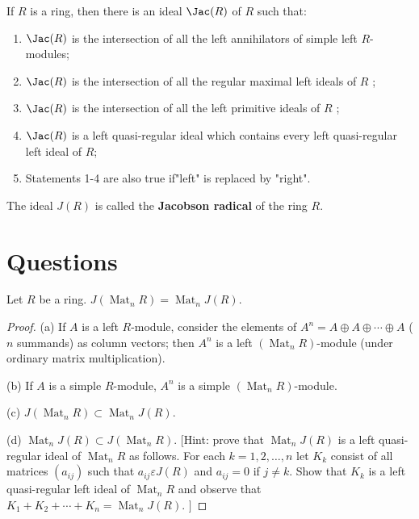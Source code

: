 \begin{theorem}
    If $R$ is a ring, then there is an ideal $\Jac(R)$ of $R$ such that:
    \begin{enumerate}
        \item
              $\Jac(R)$ is the intersection of all the left annihilators of simple left $R$-modules;

        \item
              $\Jac(R)$ is the intersection of all the regular maximal left ideals of $R$ ;

        \item
              $\Jac(R)$ is the intersection of all the left primitive ideals of $R$ ;

        \item
              $\Jac(R)$ is a left quasi-regular ideal which contains every left quasi-regular left ideal of $R$;

        \item
              Statements 1-4 are also true if"left" is replaced by "right".
    \end{enumerate}
    The ideal $J(R)$ is called the \textbf{Jacobson radical} of the ring $R$.
\end{theorem}



\section{Questions}
\begin{question}
    Let $R$ be a ring. $J\left(\operatorname{Mat}_n R\right)=\operatorname{Mat}_n J(R)$.
    \begin{proof}
        (a) If $A$ is a left $R$-module, consider the elements of $A^n=A \oplus A \oplus \cdots \oplus A$ ( $n$ summands) as column vectors; then $A^n$ is a left $\left(\operatorname{Mat}_n R\right)$-module (under ordinary matrix multiplication).

        (b) If $A$ is a simple $R$-module, $A^n$ is a simple $\left(\operatorname{Mat}_n R\right)$-module.

        (c) $J\left(\operatorname{Mat}_n R\right) \subset \operatorname{Mat}_n J(R)$.

        (d) $\operatorname{Mat}_n J(R) \subset J\left(\operatorname{Mat}_n R\right)$. [Hint: prove that $\operatorname{Mat}_n J(R)$ is a left quasi-regular ideal of $\operatorname{Mat}_n R$ as follows. For each $k=1,2, \ldots, n$ let $K_k$ consist of all matrices $\left(a_{i j}\right)$ such that $a_{i j} \varepsilon J(R)$ and $a_{i j}=0$ if $j \neq k$. Show that $K_k$ is a left quasi-regular left ideal of $\operatorname{Mat}_n R$ and observe that $K_1+K_2+\cdots+K_n=\operatorname{Mat}_n J(R)$. $]$
    \end{proof}
\end{question}


